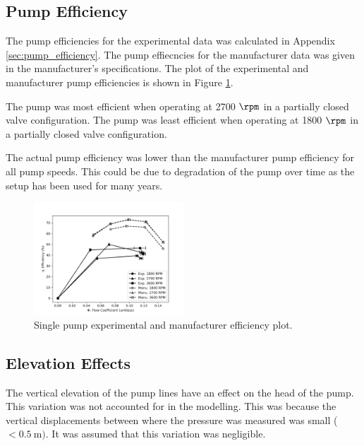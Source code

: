 \subsection{Pump Efficiency}
The pump efficiencies for the experimental data was calculated in Appendix \ref{sec:pump_efficiency}. The pump effiecncies for the manufacturer data was given in the manufacturer's specifications. The plot of the experimental and manufacturer pump efficiencies is shown in Figure \ref{fig:single_pump_efficiency_plot}.

The pump was most efficient when operating at 2700 $\unit{\rpm}$ in a partially closed valve configuration. The pump was least efficient when operating at 1800 $\unit{\rpm}$ in a partially closed valve configuration. 

The actual pump efficiency was lower than the manufacturer pump efficiency for all pump speeds. This could be due to degradation of the pump over time as the setup has been used for many years. 
\begin{figure}[H]
    \centering
    \includegraphics[width=0.5\textwidth]{Sections/Figures/Single Pump Efficiency Plot.png}
    \caption{Single pump experimental and manufacturer efficiency plot.}
    \label{fig:single_pump_efficiency_plot}
\end{figure}

\subsection{Elevation Effects}
The vertical elevation of the pump lines have an effect on the head of the pump. This variation was not accounted for in the modelling. This was because the vertical displacements between where the pressure was measured was small ($< \qty{0.5}{\meter})$. It was assumed that this variation was negligible.